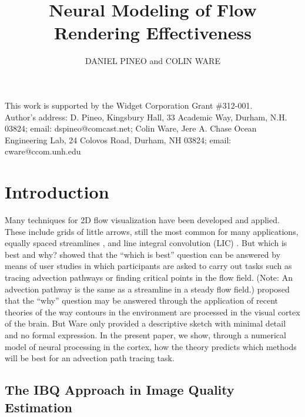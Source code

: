 \documentclass[prodmode,acmtap]{acmlarge}
\title{Neural Modeling of Flow Rendering Effectiveness}
\author{DANIEL PINEO and COLIN WARE \affil{University of New Hampshire}}
\begin{document}
\begin{bottomstuff}
This work is supported by the Widget Corporation Grant \#312-001.\\
Author's address: D. Pineo, Kingsbury Hall, 33 Academic Way, Durham,
N.H. 03824; email: dspineo@comcast.net; Colin Ware, Jere A. Chase
Ocean Engineering Lab, 24 Colovos Road, Durham, NH 03824; email: cware@ccom.unh.edu
\end{bottomstuff}
\maketitle

\section{Introduction}

Many techniques for 2D flow visualization have been developed and
applied. These include grids of little arrows, still the most common
for many applications, equally spaced streamlines
\cite{Turk1996,Jobard1997}, and line integral convolution (LIC)
\cite{Cabral1993}. But which is best and why? 
showed that the ``which is best'' question can be answered by means
of user studies in which participants are asked to carry out tasks
such as tracing advection pathways or finding critical points in the
flow field. (Note: An advection pathway is the same as a streamline
in a steady flow field.)  proposed that the ``why''
question may be answered through the application of recent theories
of the way contours in the environment are processed in the visual
cortex of the brain. But Ware only provided a descriptive sketch
with minimal detail and no formal expression. In the present paper,
we show, through a numerical model of neural processing in the
cortex, how the theory predicts which methods will be best for an
advection path tracing task.

\subsection{The IBQ Approach in Image Quality Estimation}
\end{document}
